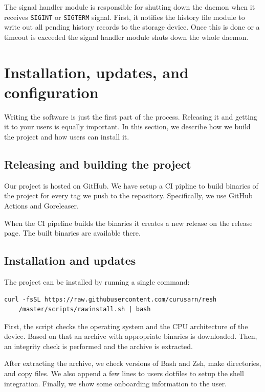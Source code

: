 The signal handler module is responsible for shutting down the daemon when it receives \verb|SIGINT| or \verb|SIGTERM| signal. First, it notifies the history file module to write out all pending history records to the storage device. Once this is done or a timeout is exceeded the signal handler module shuts down the whole daemon.


\section{Installation, updates, and configuration}

Writing the software is just the first part of the process. Releasing it and getting it to your users is equally important. In this section, we describe how we build the project and how users can install it.

\subsection{Releasing and building the project}

Our project is hosted on GitHub\cite{resh-github-homepage}. We have setup a CI pipline to build binaries of the project for every tag we push to the repository. Specifically, we use GitHub Actions\cite{github-actions} and Goreleaser\cite{tools-goreleaser}.

When the CI pipeline builds the binaries it creates a new release on the release page\cite{resh-github-releases}. The built binaries are available there. 

\subsection{Installation and updates}

The project can be installed by running a single command:

\begin{verbatim}
curl -fsSL https://raw.githubusercontent.com/curusarn/resh
    /master/scripts/rawinstall.sh | bash
\end{verbatim}

First, the script checks the operating system and the CPU architecture of the device. Based on that an archive with appropriate binaries is downloaded. Then, an integrity check is performed and the archive is extracted. 

After extracting the archive, we check versions of Bash and Zsh, make directories, and copy files. We also append a few lines to users dotfiles to setup the shell integration. Finally, we show some onboarding information to the user.

